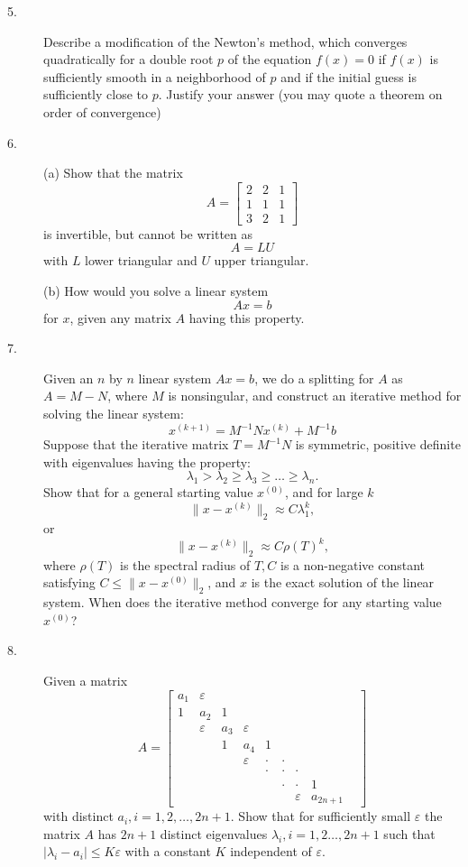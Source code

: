 \documentclass{article}
\begin{document}
\begin{description}
\item[5.]
Describe a modification of the Newton's method, which converges quadratically
for a double root $p$ of the equation $f(x) = 0$ if $f(x)$ is sufficiently
smooth in a neighborhood of $p$ and if the initial guess is sufficiently
close to $p$. Justify your answer (you may quote a theorem on order of
convergence)

\item[6.] (a)
Show that the matrix
$$A= \begin{bmatrix}
        2&2&1 \\
        1&1&1 \\
        3&2&1
        \end{bmatrix}$$
is invertible, but cannot be written as
$$A=LU$$
with $L$ lower triangular and $U$ upper triangular.

\item[\quad] (b)
How would you solve a linear system
$$Ax=b$$
for $x$, given any matrix $A$ having this property.

\item[7.]
Given an $n$ by $n$ linear system $Ax=b$, we do a splitting for $A$ as
$A=M-N$, where $M$ is nonsingular, and construct an iterative method
for solving the linear system:
$$x^{(k+1)} = M^{-1} Nx^{(k)} + M^{-1} b$$
Suppose that the iterative matrix $T=M^{-1}N$ is symmetric, positive definite
with eigenvalues having the property:
$$\lambda_1 > \lambda_2 \geq \lambda_3 \geq \dots \geq \lambda_n.$$
Show that for a general starting value $x^{(0)}$, and for large $k$
$$\parallel x-x^{(k)} \parallel_2 \approx C \lambda^k_1,$$
or
$$\parallel x-x^{(k)} \parallel_2 \approx C \rho (T)^k,$$
where $\rho (T)$ is the spectral radius of $T,C$ is a non-negative constant
satisfying $C \leq \parallel x-x^{(0)} \parallel_2$, and $x$ is the exact
solution of the linear system. When does the iterative method converge for
any starting value $x^{(0)}$?

\item[8.]
Given a matrix
$$A= \begin{bmatrix}
        a_1 & \varepsilon &&&&&&& \\
        1 & a_2 & 1 &&&&& \\
        & \varepsilon & a_3 & \varepsilon &&&& \\
        && 1 & a_4 & 1 &&& \\
        &&& \varepsilon & \cdot & \cdot && \\
        &&&& \cdot & \cdot & \cdot & \\
        &&&&& \cdot & \cdot & 1 \\
        &&&&&& \varepsilon & a_{2n+1}
        \end{bmatrix}$$
with distinct $a_i, i=1,2, \dots, 2n+1$. Show that for sufficiently small
$\varepsilon$ the matrix $A$ has $2n+1$ distinct eigenvalues
$\lambda_i, i =1,2 \dots, 2n+1$ such that
$|\lambda_i - a_i| \leq K \varepsilon$ with a constant $K$ independent
of $\varepsilon$.


\end{description}
\end{document}
